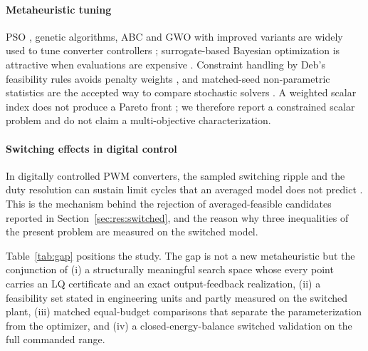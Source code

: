 \paragraph{Metaheuristic tuning}
PSO \citep{Kennedy1995}, genetic algorithms, ABC \citep{Karaboga2008} and GWO
\citep{Mirjalili2014} with improved variants
\citep{Hou2022,NadimiShahraki2021,Alsamia2024} are widely used to tune converter
controllers \citep{Izci2022,Nanyan2024,ValenciaRivera2024}; surrogate-based
Bayesian optimization is attractive when evaluations are expensive
\citep{Snoek2012,Coutinho2023}. Constraint handling by Deb's feasibility rules
avoids penalty weights \citep{Deb2000}, and matched-seed non-parametric
statistics are the accepted way to compare stochastic solvers
\citep{Demsar2006}. A weighted scalar index does not produce a Pareto front
\citep{RodriguezMolina2020}; we therefore report a constrained scalar problem
and do not claim a multi-objective characterization.

\paragraph{Switching effects in digital control}
In digitally controlled PWM converters, the sampled switching ripple and the
duty resolution can sustain limit cycles that an averaged model does not
predict \citep{Peterchev2003}. This is the mechanism behind the rejection of
averaged-feasible candidates reported in Section~\ref{sec:res:switched}, and the
reason why three inequalities of the present problem are measured on the
switched model.

Table~\ref{tab:gap} positions the study. The gap is not a new metaheuristic but
the conjunction of (i) a structurally meaningful search space whose every point
carries an LQ certificate and an exact output-feedback realization, (ii) a
feasibility set stated in engineering units and partly measured on the
switched plant, (iii) matched equal-budget comparisons that separate the
parameterization from the optimizer, and (iv) a closed-energy-balance switched
validation on the full commanded range.

